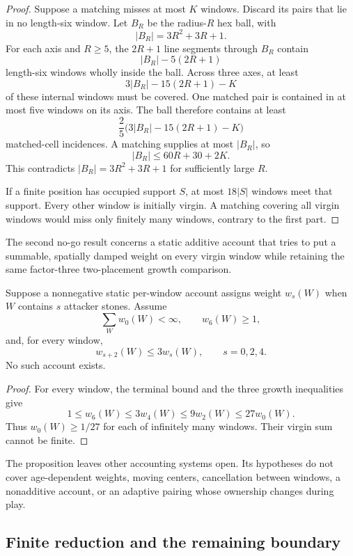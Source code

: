 \begin{proof}
Suppose a matching misses at most $K$ windows.  Discard its pairs that lie in
no length-six window.  Let $B_R$ be the radius-$R$ hex ball, with
\[
 |B_R|=3R^2+3R+1.
\]
For each axis and $R\geq5$, the $2R+1$ line segments through $B_R$ contain
\[
 |B_R|-5(2R+1)
\]
length-six windows wholly inside the ball.  Across three axes, at least
\[
 3|B_R|-15(2R+1)-K
\]
of these internal windows must be covered.  One matched pair is contained in
at most five windows on its axis.  The ball therefore contains at least
\[
 \frac25\bigl(3|B_R|-15(2R+1)-K\bigr)
\]
matched-cell incidences.  A matching supplies at most $|B_R|$, so
\[
 |B_R|\leq60R+30+2K.
\]
This contradicts $|B_R|=3R^2+3R+1$ for sufficiently large $R$.

If a finite position has occupied support $S$, at most $18|S|$ windows meet
that support.  Every other window is initially virgin.  A matching covering
all virgin windows would miss only finitely many windows, contrary to the
first part.
\end{proof}

The second no-go result concerns a static additive account that tries to put
a summable, spatially damped weight on every virgin window while retaining the
same factor-three two-placement growth comparison.

\begin{proposition}
\label{prop:ES-no-static-damping}
Suppose a nonnegative static per-window account assigns weight $w_s(W)$ when
$W$ contains $s$ attacker stones.  Assume
\[
 \sum_W w_0(W)<\infty,\qquad w_6(W)\geq1,
\]
and, for every window,
\[
 w_{s+2}(W)\leq3w_s(W),\qquad s=0,2,4.
\tag{10.20}
\]
No such account exists.
\end{proposition}

\begin{proof}
For every window, the terminal bound and the three growth inequalities give
\[
 1\leq w_6(W)\leq3w_4(W)\leq9w_2(W)\leq27w_0(W).
\]
Thus $w_0(W)\geq1/27$ for each of infinitely many windows.  Their virgin sum
cannot be finite.
\end{proof}

The proposition leaves other accounting systems open.  Its hypotheses do not
cover age-dependent weights, moving centers, cancellation between windows, a
nonadditive account, or an adaptive pairing whose ownership changes during
play.

\subsection{Finite reduction and the remaining boundary}

